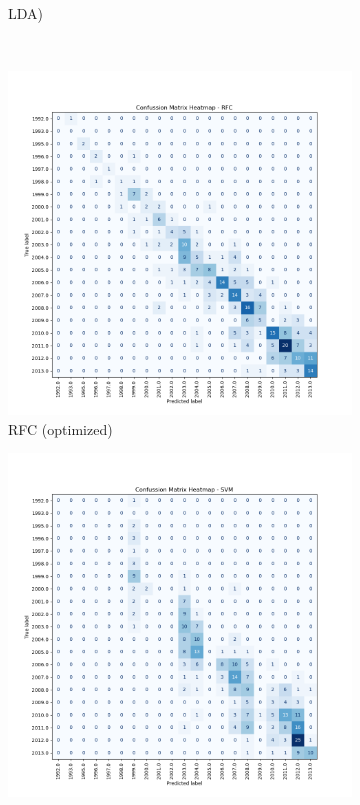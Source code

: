 \documentclass[conference,onecolumn]{IEEEtran}
\begin{document}
\begin{figure}
\begin{subfigure}{0.4\textwidth}
            \caption{LDA)}
            \label{appx:cmheatmaplda}
        \end{subfigure}\\
        \begin{subfigure}{0.4\textwidth}
            \centering
            \includegraphics[width=\linewidth]{Plots/CM_Heatmap_RFC.png}
            \caption{RFC (optimized)}
            \label{appx:cmheatmaprfc}
        \end{subfigure}%
        \begin{subfigure}{0.4\textwidth}
            \centering
            \includegraphics[width=\linewidth]{Plots/CM_Heatmap_SVM.png}

\end{subfigure}
\end{figure}
\end{document}
